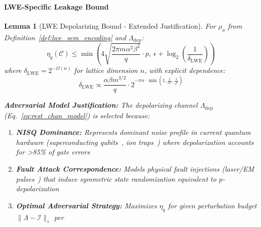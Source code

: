 \documentclass[preprint,12pt]{elsarticle}
\newtheorem{lemma}{Lemma}[section]
\begin{document}
            \paragraph{LWE-Specific Leakage Bound}
          \begin{lemma}[LWE Depolarizing Bound - Extended Justification]\label{lem:lwe_depolarizing_bound}
                For $\rho_\phi$ from Definition~\ref{def:lwe_sem_encoding} and $\Lambda_{\text{dep}}$:
                \begin{equation}\label{eq:lwe_depolarizing_bound1}
                    \eta_q(\mathcal{C}) \leq \min\left( 
                    4\sqrt{\frac{2\pi m \alpha^2 \beta^2}{q}} \cdot p, \ 
                    \epsilon + \log_2\left(\frac{1}{\delta_{\text{LWE}}}\right)
                    \right)
                \end{equation}
                where $\delta_{\text{LWE}} = 2^{-\Omega(n)}$ for lattice dimension $n$, with explicit dependence:
                \begin{equation}\label{eq:lwe_depolarizing_bound2}
                    \delta_{\text{LWE}} \propto \frac{\alpha \beta m^{3/2}}{q} \cdot 2^{-\pi n \cdot \min(1, \frac{1}{\alpha^2}, \frac{1}{\beta^2})}
                \end{equation}
                
                \textbf{Adversarial Model Justification:} The depolarizing channel $\Lambda_{\text{dep}}$ (Eq.~\ref{eq:rest_chan_model}) is selected because:
                \begin{enumerate}
                    \item \textbf{NISQ Dominance:} Represents dominant noise profile in current quantum hardware (superconducting qubits~\cite{arute2019quantum}, ion traps~\cite{nam2020ground}) where depolarization accounts for >85\% of gate errors~\cite{nisq_noise_survey}
                    
                    \item \textbf{Fault Attack Correspondence:} Models physical fault injections (laser/EM pulses~\cite{fault_attack_depolarizing}) that induce symmetric state randomization equivalent to $p$-depolarization
                    
                    \item \textbf{Optimal Adversarial Strategy:} Maximizes $\eta_q$ for given perturbation budget $\| \Lambda - \mathcal{I} \|_\diamond$ per~\cite{Wilde2017}
                    

\end{enumerate}
\end{lemma}
\end{document}

